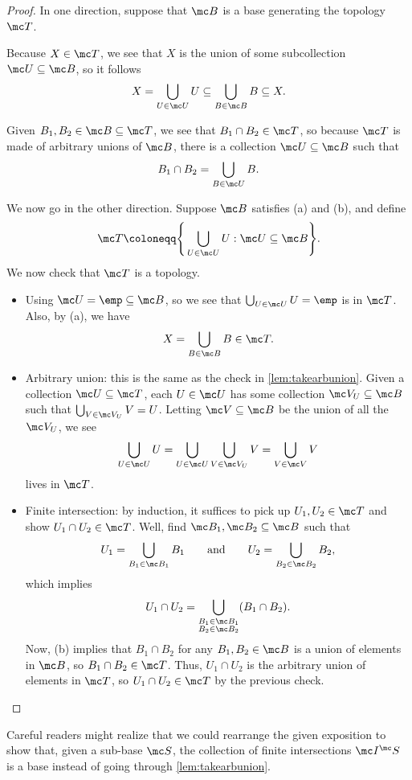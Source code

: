 \documentclass[../notes.tex]{subfiles}
\begin{document}
\begin{proof}
	In one direction, suppose that $\mc B$ is a base generating the topology $\mc T$.
	\begin{listalph}
		\item Because $X\in\mc T$, we see that $X$ is the union of some subcollection $\mc U\subseteq\mc B$, so it follows
		\[X=\bigcup_{U\in\mc U}U\subseteq\bigcup_{B\in\mc B}B\subseteq X.\]
		\item Given $B_1,B_2\in\mc B\subseteq\mc T$, we see that $B_1\cap B_2\in\mc T$, so because $\mc T$ is made of arbitrary unions of $\mc B$, there is a collection $\mc U\subseteq\mc B$ such that
		\[B_1\cap B_2=\bigcup_{B\in\mc U}B.\]
	\end{listalph}
	We now go in the other direction. Suppose $\mc B$ satisfies (a) and (b), and define
	\[\mc T\coloneqq\Bigg\{\bigcup_{U\in\mc U}U:\mc U\subseteq\mc B\Bigg\}.\]
	We now check that $\mc T$ is a topology.
	\begin{itemize}
		\item Using $\mc U=\emp\subseteq\mc B$, so we see that $\bigcup_{U\in\mc U}U=\emp$ is in $\mc T$. Also, by (a), we have
		\[X=\bigcup_{B\in\mc B}B\in\mc T.\]
		\item Arbitrary union: this is the same as the check in \autoref{lem:takearbunion}. Given a collection $\mc U\subseteq\mc T$, each $U\in\mc U$ has some collection $\mc V_U\subseteq\mc B$ such that $\bigcup_{V\in\mc V_U}V=U$. Letting $\mc V\subseteq\mc B$ be the union of all the $\mc V_U$, we see
		\[\bigcup_{U\in\mc U}U=\bigcup_{U\in\mc U}\bigcup_{V\in\mc V_U}V=\bigcup_{V\in\mc V}V\]
		lives in $\mc T$.
		\item Finite intersection: by induction, it suffices to pick up $U_1,U_2\in\mc T$ and show $U_1\cap U_2\in\mc T$. Well, find $\mc B_1,\mc B_2\subseteq\mc B$ such that
		\[U_1=\bigcup_{B_1\in\mc B_1}B_1\qquad\text{and}\qquad U_2=\bigcup_{B_2\in\mc B_2}B_2,\]
		which implies
		\[U_1\cap U_2=\bigcup_{\substack{B_1\in\mc B_1\\B_2\in\mc B_2}}(B_1\cap B_2).\]
		Now, (b) implies that $B_1\cap B_2$ for any $B_1,B_2\in\mc B$ is a union of elements in $\mc B$, so $B_1\cap B_2\in\mc T$. Thus, $U_1\cap U_2$ is the arbitrary union of elements in $\mc T$, so $U_1\cap U_2\in\mc T$ by the previous check.
		\qedhere
	\end{itemize}
\end{proof}
\begin{remark}[Nir]
	Careful readers might realize that we could rearrange the given exposition to show that, given a sub-base $\mc S$, the collection of finite intersections $\mc I^\mc S$ is a base instead of going through \autoref{lem:takearbunion}.
\end{remark}
\end{document}
